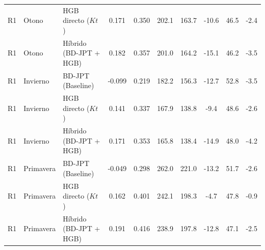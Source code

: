 \documentclass[../main.tex]{subfiles}
\begin{document}
\begin{table}[!ht]
{\begin{tabular}{l l l c c c c c c c}
R1 & Otono & HGB directo ($Kt$) & 0.171 & 0.350 & 202.1 & 163.7 & -10.6 & 46.5 & -2.4 \\
R1 & Otono & Híbrido (BD-JPT + HGB) & 0.182 & 0.357 & 201.0 & 164.2 & -15.1 & 46.2 & -3.5 \\
R1 & Invierno & BD-JPT (Baseline) & -0.099 & 0.219 & 182.2 & 156.3 & -12.7 & 52.8 & -3.5 \\
R1 & Invierno & HGB directo ($Kt$) & 0.141 & 0.337 & 167.9 & 138.8 & -9.4 & 48.6 & -2.6 \\
R1 & Invierno & Híbrido (BD-JPT + HGB) & 0.171 & 0.353 & 165.8 & 138.4 & -14.9 & 48.0 & -4.2 \\
R1 & Primavera & BD-JPT (Baseline) & -0.049 & 0.298 & 262.0 & 221.0 & -13.2 & 51.7 & -2.6 \\
R1 & Primavera & HGB directo ($Kt$) & 0.162 & 0.401 & 242.1 & 198.3 & -4.7 & 47.8 & -0.9 \\
R1 & Primavera & Híbrido (BD-JPT + HGB) & 0.191 & 0.416 & 238.9 & 197.8 & -12.8 & 47.1 & -2.5 \\
\bottomrule
\end{tabular}
}
\end{table}

\newpage
\end{document}
